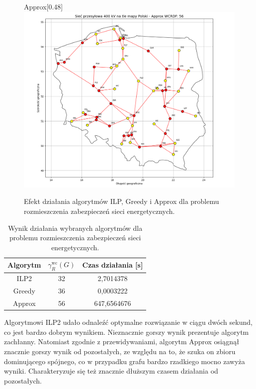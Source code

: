 \begin{figure}[htbp]
    \hfill
    \begin{subcaptionbox}{Approx\label{fig:img1}}[0.48\linewidth]
        {\includegraphics[width=\linewidth]{assets/Poland/img_1.png}}
    \end{subcaptionbox}
    \caption{Efekt działania algorytmów ILP, Greedy i Approx dla problemu rozmieszczenia zabezpieczeń sieci energetycznych.}
    \label{fig:poland}
\end{figure}

\begin{table}[H]
    \centering
    \begin{tabular}{|c|c|c|}
        \hline
    Algorytm & $\gamma^{\text{wc}}_R(G)$ & Czas działania [s] \\     \hline
    ILP2 & 32 & 2,7014378 \\ \hline
    Greedy & 36 & 0,0003222 \\ \hline
Approx & 56 & 647,6564676 \\ \hline
\end{tabular}
\caption{Wynik działania wybranych algorytmów dla problemu rozmieszczenia zabezpieczeń sieci energetycznych.}
\end{table}

Algorytmowi ILP2 udało odnaleźć optymalne rozwiązanie w ciągu dwóch sekund, co jest bardzo dobrym wynikiem. Nieznacznie gorszy wynik prezentuje algorytm zachłanny. Natomiast zgodnie z przewidywaniami, algorytm Approx osiągnął znacznie gorszy wynik od pozostałych, ze względu na to, że szuka on zbioru dominującego spójnego, co w przypadku grafu bardzo rzadkiego mocno zawyża wyniki. Charakteryzuje się też znacznie dłuższym czasem działania od pozostałych.\\

